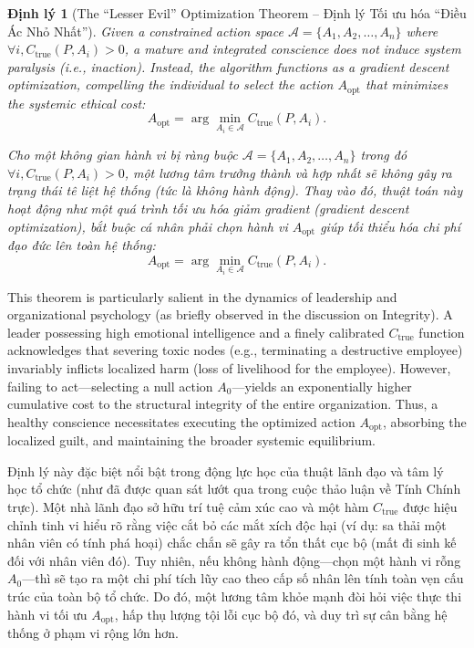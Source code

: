 \documentclass{report}
\newtheorem{dinhly}{Định lý}
\begin{document}
\begin{dinhly}[The ``Lesser Evil'' Optimization Theorem -- Định lý Tối ưu hóa ``Điều Ác Nhỏ Nhất'']
	Given a constrained action space $\mathcal{A} = \{A_1, A_2, \dots, A_n\}$ where $\forall i, C_{\text{true}}(P, A_i) > 0$, a mature and integrated conscience does not induce system paralysis (i.e., inaction). Instead, the algorithm functions as a gradient descent optimization, compelling the individual to select the action $A_{\text{opt}}$ that minimizes the systemic ethical cost:
	\begin{equation*}
		A_{\text{opt}} = \arg\min_{A_i \in \mathcal{A}} C_{\text{true}}(P, A_i).
	\end{equation*}
	
	Cho một không gian hành vi bị ràng buộc $\mathcal{A} = \{A_1, A_2, \dots, A_n\}$ trong đó $\forall i, C_{\text{true}}(P, A_i) > 0$, một lương tâm trưởng thành và hợp nhất sẽ không gây ra trạng thái tê liệt hệ thống (tức là không hành động). Thay vào đó, thuật toán này hoạt động như một quá trình tối ưu hóa giảm gradient (gradient descent optimization), bắt buộc cá nhân phải chọn hành vi $A_{\text{opt}}$ giúp tối thiểu hóa chi phí đạo đức lên toàn hệ thống:
	\begin{equation*}
		A_{\text{opt}} = \arg\min_{A_i \in \mathcal{A}} C_{\text{true}}(P, A_i).
	\end{equation*}
\end{dinhly}

This theorem is particularly salient in the dynamics of leadership and organizational psychology (as briefly observed in the discussion on Integrity). A leader possessing high emotional intelligence and a finely calibrated $C_{\text{true}}$ function acknowledges that severing toxic nodes (e.g., terminating a destructive employee) invariably inflicts localized harm (loss of livelihood for the employee). However, failing to act—selecting a null action $A_0$—yields an exponentially higher cumulative cost to the structural integrity of the entire organization. Thus, a healthy conscience necessitates executing the optimized action $A_{\text{opt}}$, absorbing the localized guilt, and maintaining the broader systemic equilibrium.

	Định lý này đặc biệt nổi bật trong động lực học của thuật lãnh đạo và tâm lý học tổ chức (như đã được quan sát lướt qua trong cuộc thảo luận về Tính Chính trực). Một nhà lãnh đạo sở hữu trí tuệ cảm xúc cao và một hàm $C_{\text{true}}$ được hiệu chỉnh tinh vi hiểu rõ rằng việc cắt bỏ các mắt xích độc hại (ví dụ: sa thải một nhân viên có tính phá hoại) chắc chắn sẽ gây ra tổn thất cục bộ (mất đi sinh kế đối với nhân viên đó). Tuy nhiên, nếu không hành động—chọn một hành vi rỗng $A_0$—thì sẽ tạo ra một chi phí tích lũy cao theo cấp số nhân lên tính toàn vẹn cấu trúc của toàn bộ tổ chức. Do đó, một lương tâm khỏe mạnh đòi hỏi việc thực thi hành vi tối ưu $A_{\text{opt}}$, hấp thụ lượng tội lỗi cục bộ đó, và duy trì sự cân bằng hệ thống ở phạm vi rộng lớn hơn.
\end{document}

